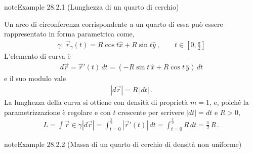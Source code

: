 \documentclass[letterpaper,10pt,italian]{jupyterBook}
\begin{document}
\begin{sphinxadmonition}{note}{Example 28.2.1 (Lunghezza di un quarto di cerchio)}



\sphinxAtStartPar
Un arco di circonferenza corrispondente a un quarto di essa può essere rappresentato in forma parametrica come,
\begin{equation*}
\begin{split}\gamma: \, \vec{r}_{\gamma}(t) = R \cos t \hat{x}  + R \sin t \hat{y} \ , \qquad t \in \left[ 0, \frac{\pi}{2} \right]\end{split}
\end{equation*}
\sphinxAtStartPar
L’elemento di curva è
\begin{equation*}
\begin{split}d \vec{r} = \vec{r}'(t) \, dt = \left( - R \sin t \, \hat{x} + R \cos t \, \hat{y} \right) \, dt \end{split}
\end{equation*}
\sphinxAtStartPar
e il suo modulo vale
\begin{equation*}
\begin{split}|d \vec{r}| = R \, |dt| \ .\end{split}
\end{equation*}
\sphinxAtStartPar
La lunghezza della curva si ottiene con densità di proprietà \(m = 1\),  e, poiché la parametrizzazione è regolare e con \(t\) crescente per scrivere \(|d t| = d t\) e \(R > 0\),
\begin{equation*}
\begin{split}L = \int{\vec{r}\in \gamma} |d \vec{r}| =\int_{t = 0}^{\frac{\pi}{2}} \left|\vec{r}'(t)\right| \, dt =  \int_{t = 0}^{\frac{\pi}{2}} R \, dt = \frac{\pi}{2} \, R \ .\end{split}
\end{equation*}\end{sphinxadmonition}
\label{ch/vector-calculus/integrals:example-1}
\begin{sphinxadmonition}{note}{Example 28.2.2 (Massa di un quarto di cerchio di densità non uniforme)}


\end{sphinxadmonition}
\label{ch/vector-calculus/integrals:example-2}
\end{document}
